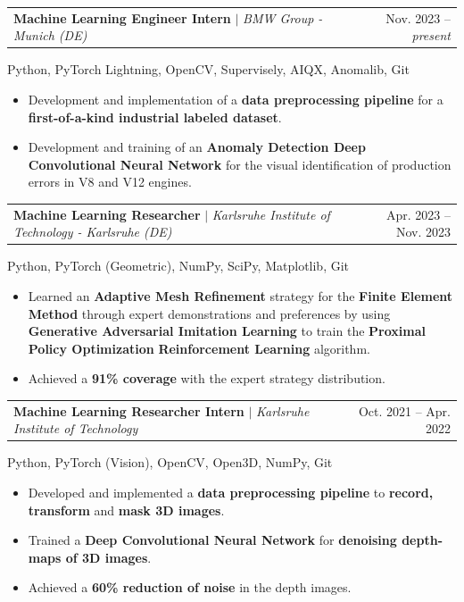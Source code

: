 \documentclass[letterpaper,11pt]{article}
\makeatletter
\newcommand{\resumeItem}[1]{
  \item\small{
    {#1 \vspace{-2pt}}
  }
}
\newcommand{\resumeProjectHeading}[2]{
    \item
    \begin{tabular*}{0.97\textwidth}{l@{\extracolsep{\fill}}r}
      \small#1 & #2 \\
    \end{tabular*}\vspace{-7pt}
}
\newcommand{\resumeItemListStart}{\begin{itemize}}
\newcommand{\resumeItemListEnd}{\end{itemize}\vspace{-5pt}}
\makeatother
\begin{document}
\resumeProjectHeading
{\textbf{Machine Learning Engineer Intern} $|$ \footnotesize\emph{BMW Group - Munich (DE)}\vspace{8pt}}{Nov. 2023 -- \textit{present}}
{\small{Python, PyTorch Lightning, OpenCV, Supervisely, AIQX, Anomalib, Git}}
\vspace*{-5pt}
\resumeItemListStart
\resumeItem{Development and implementation of a \textbf{data preprocessing pipeline} for a \textbf{first-of-a-kind industrial labeled dataset}.}
\resumeItem{Development and training of an \textbf{Anomaly Detection Deep Convolutional Neural Network} for the visual identification of production errors in V8 and V12 engines.}
\resumeItemListEnd

\vspace{5pt}
\resumeProjectHeading
{\textbf{Machine Learning Researcher} $|$ \footnotesize\emph{Karlsruhe Institute of Technology - Karlsruhe (DE)}\vspace{8pt}}{Apr. 2023 -- Nov. 2023}
{\small{Python, PyTorch (Geometric), NumPy, SciPy, Matplotlib, Git}}
\vspace*{-5pt}
\resumeItemListStart
\resumeItem{Learned an \textbf{Adaptive Mesh Refinement} strategy for the \textbf{Finite Element Method} through expert demonstrations and preferences by using \textbf{Generative Adversarial Imitation Learning} to train the \textbf{Proximal Policy Optimization} \textbf{Reinforcement Learning} algorithm.}
\resumeItem{Achieved a \textbf{91\% coverage} with the expert strategy distribution.}
\resumeItemListEnd

\vspace{5pt}
\resumeProjectHeading
{\textbf{Machine Learning Researcher Intern} $|$ \footnotesize\emph{Karlsruhe Institute of Technology}\vspace{8pt}}{Oct. 2021 -- Apr. 2022}
{\small Python, PyTorch (Vision), OpenCV, Open3D, NumPy, Git}
\vspace*{-5pt}
\resumeItemListStart
\resumeItem{Developed and implemented a \textbf{data preprocessing pipeline} to \textbf{record, transform} and \textbf{mask 3D images}.}
\resumeItem{Trained a \textbf{Deep Convolutional Neural Network} for \textbf{denoising depth-maps of 3D images}.}
\resumeItem{Achieved a \textbf{60\% reduction of noise} in the depth images.}
\resumeItemListEnd
\end{document}
